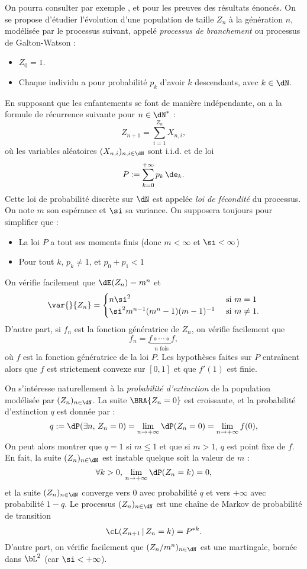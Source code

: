 {{On pourra consulter par exemple \cite{harris-63}, \cite{harris-fr} et
\cite{williams} pour les preuves des résultats énoncés. On se propose
d'étudier l'évolution d'une population de taille $Z_n$ à la génération
$n$, modélisée par le processus suivant, appelé \emph{processus de
  branchement} ou processus de Galton-Watson :
\begin{itemize}
\item $Z_0=1$.
\item Chaque individu a pour probabilité $p_k$ d'avoir $k$ descendants, avec
  $k\in\dN$.
\end{itemize}
En supposant que les enfantements se font de manière indépendante, on
a la formule de récurrence suivante pour $n\in\dN^*$ :
$$
Z_{n+1}=\sum_{i=1}^{Z_n} X_{n,i},
$$
où les variables aléatoires $(X_{n,i})_{n,i\in\dN}$ sont i.i.d. et
de loi
$$
P:=\sum_{k=0}^{+\infty} p_k\,\de_k. 
$$
Cette loi de probabilité discrète sur $\dN$ est appelée \emph{loi
  de fécondité} du processus. On note $m$ son espérance et $\si$ sa
variance.  On supposera toujours pour simplifier que :
\begin{itemize}
\item La loi $P$ a tout ses moments finis (donc $m<\infty$ et
  $\si<\infty$)
\item Pour tout $k$, $p_k\neq 1$, et $p_0+p_1<1$
\end{itemize}
On vérifie facilement que $\dE(Z_n)=m^n$ et 
$$
\var{}{Z_n}=
\begin{cases}
  n\si^2 & \text{ si $m=1$}\\
  \si^2m^{n-1}(m^n-1)(m-1)^{-1} & \text{ si $m\neq 1$}.
\end{cases}
$$
D'autre part, si $f_n$ est la fonction génératrice de $Z_n$, on
vérifie facilement que
$$
f_n=\underbrace{f\circ \cdots \circ f}_{n \text{ fois}},
$$
où $f$ est la fonction génératrice de la loi $P$. Les hypothèses
faites sur $P$ entraînent alors que $f$ est strictement convexe sur
$[0,1]$ et que $f'(1)$ est finie.

On s'intéresse naturellement à la \emph{probabilité d'extinction} de
la population modélisée par $(Z_n)_{n\in\dN}$.  La suite $\BRA{Z_n=0}$
est croissante, et la probabilité d'extinction $q$ est donnée par :
$$
q:=\dP(\exists n,\,Z_n=0) =\lim_{n\to+\infty} \dP(Z_n=0)
=\lim_{n\to+\infty} f(0),
$$
On peut alors montrer que $q=1$ si $m\leq 1$ et que si $m>1$, $q$ est point
fixe de $f$. En fait, la suite $(Z_n)_{n\in\dN}$ est instable quelque soit la
valeur de $m$ :
$$
\forall k>0,\,\lim_{n\to+\infty}\dP(Z_n=k)=0, 
$$
et la suite $(Z_n)_{n\in\dN}$ converge vers $0$ avec probabilité $q$ et
vers $+\infty$ avec probabilité $1-q$. Le processus $(Z_n)_{n\in\dN}$ est une
chaîne de Markov de probabilité de transition
$$
\cL(Z_{n+1}\,\vert\,Z_n=k)=P^{*k}.
$$
D'autre part, on vérifie facilement que $(Z_n/m^n)_{n\in\dN}$ est une
martingale, bornée dans $\bL^2$ (car $\si<+\infty$).

}}
